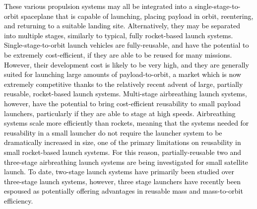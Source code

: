   	\textcolor{black}{These various propulsion systems may all be integrated into a single-stage-to-orbit spaceplane that is capable of launching, placing payload in orbit, reentering, and returning to a suitable landing site\cite{Argus,Powell1991,Trefny1999,Roche2000,Pescetelli2012,Young2006,Bradford2000,Hyperion}. Alternatively, they may be separated into multiple stages, similarly to typical, fully rocket-based launch systems\cite{Wilhite1991,Fujikawa2017,Mehta2001,Takahashi1997,Aberleen,Germain2001,Eklund2012,Bradford2002,Kimura1999,Preller2018a}. Single-stage-to-orbit launch vehicles are fully-reusable, and have the potential to be extremely cost-efficient, if they are able to be reused for many missions\cite{Mcclinton2008}. However, their development cost is likely to be very high, and they are generally suited for launching large amounts of payload-to-orbit\cite{Argus,Powell1991,Trefny1999,Roche2000,Pescetelli2012,Young2006,Bradford2000,Hyperion}, a market which is now extremely competitive thanks to the relatively recent advent of large, partially reusable, rocket-based launch systems. Multi-stage airbreathing launch systems, however, have the potential to bring cost-efficient reusability to small payload launchers\cite{Preller2017b}, particularly if they are able to stage at high speeds\cite{Mcclinton2008}. Airbreathing systems scale more efficiently than rockets, meaning that the systems needed for reusability in a small launcher do not require the launcher system to be dramatically increased in size, one of the primary limitations on reusability in small rocket-based launch systems. For this reason, partially-reusable two and three-stage airbreathing launch systems are being investigated for small satellite launch\cite{Preller2017b}. To date, two-stage launch systems have primarily been studied over three-stage launch systems, however, three stage launchers have recently been espoused as potentially offering advantages in reusable mass and mass-to-orbit efficiency\cite{Preller2017b}.}
  	
